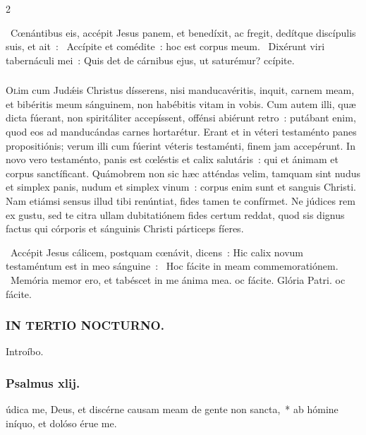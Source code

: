 \documentclass[9pt,twoside]{extarticle}
\begin{document}
\begin{multicols}{2}
\begin{tightlist}{}
\item {}~Cœnántibus eis, accépit Jesus panem, et benedíxit, ac fregit, dedítque discípulis suis, et ait~: \textred{*}~Accípite et comédite~: hoc est corpus meum. ~Dixérunt viri tabernáculi mei~: Quis det de cárnibus ejus, ut saturémur? ccípite.
\end{tightlist}

\subsubsection*{\center {}}
\lettrine{O}lim cum Judǽis Christus dísserens, nisi manducavéritis, inquit, carnem meam, et bibéritis meum sánguinem, non habébitis vitam in vobis. Cum autem illi, quæ dicta fúerant, non spiritáliter accepíssent, offénsi abiérunt retro~: putábant enim, quod eos ad manducándas carnes hortarétur. Erant et in véteri testaménto panes propositiónis; verum illi cum fúerint véteris testaménti, finem jam accepérunt. In novo vero testaménto, panis est cœléstis et calix salutáris~: qui et ánimam et corpus sanctíficant. Quámobrem non sic hæc atténdas velim, tamquam sint nudus et simplex panis, nudum et simplex vinum~: corpus enim sunt et sanguis Christi. Nam etiámsi sensus illud tibi renúntiat, fides tamen te confírmet. Ne júdices rem ex gustu, sed te citra ullam dubitatiónem fides certum reddat, quod sis dignus factus qui córporis et sánguinis Christi párticeps fíeres.

\begin{tightlist}{}
\item {}~Accépit Jesus cálicem, postquam cœnávit, dicens~: Hic calix novum testaméntum est in meo sánguine~: \textred{*}~Hoc fácite in meam commemoratiónem. ~Memória memor ero, et tabéscet in me ánima mea. oc fácite. Glória Patri. oc fácite.
\end{tightlist}

\subsubsection*{\center \textsc{IN TERTIO NOCTURNO.}}
\begin{tightlist}{}
\item {} Introíbo.
\end{tightlist}
\subsubsection*{\center Psalmus xlij.}
údica me, Deus, et discérne causam meam de gente non sancta,~* ab hómine iníquo, et dolóso érue me.


\end{multicols}
\end{document}
